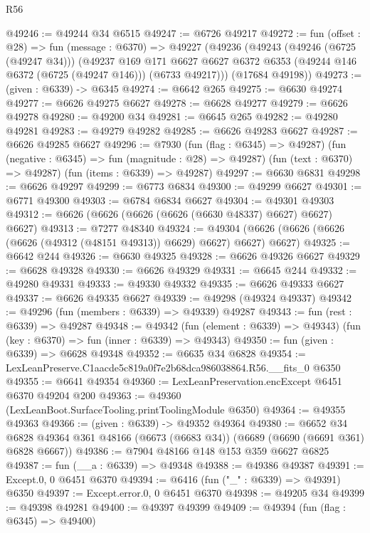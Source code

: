 \begin{lexlean}{R56}
\begin{coremodule}
@49246 := @49244 @34 @6515
@49247 := @6726 @49217
@49272 := fun (offset : @28) =>
  fun (message : @6370) =>
  @49227
    (@49236
      (@49243
        (@49246 (@6725 (@49247 @34)))
        (@49237
          @169
          @171
          @6627
          @6627
          @6372
          @6353
          (@49244 @146 @6372 (@6725 (@49247 @146)))
          (@6733 @49217)))
      (@17684 @49198))
@49273 := (given : @6339) -> @6345
@49274 := @6642 @265
@49275 := @6630 @49274
@49277 := @6626 @49275 @6627
@49278 := @6628 @49277
@49279 := @6626 @49278
@49280 := @49200 @34
@49281 := @6645 @265
@49282 := @49280 @49281
@49283 := @49279 @49282
@49285 := @6626 @49283 @6627
@49287 := @6626 @49285 @6627
@49296 := @7930
    (fun (flag : @6345) => @49287)
    (fun (negative : @6345) => fun (magnitude : @28) => @49287)
    (fun (text : @6370) => @49287)
    (fun (items : @6339) => @49287)
@49297 := @6630 @6831
@49298 := @6626 @49297
@49299 := @6773 @6834
@49300 := @49299 @6627
@49301 := @6771 @49300
@49303 := @6784 @6834 @6627
@49304 := @49301 @49303
@49312 := @6626 (@6626 (@6626 (@6626 (@6630 @48337) @6627) @6627) @6627)
@49313 := @7277 @48340
@49324 := @49304 (@6626 (@6626 (@6626 (@6626 (@49312 (@48151 @49313)) @6629) @6627) @6627) @6627)
@49325 := @6642 @244
@49326 := @6630 @49325
@49328 := @6626 @49326 @6627
@49329 := @6628 @49328
@49330 := @6626 @49329
@49331 := @6645 @244
@49332 := @49280 @49331
@49333 := @49330 @49332
@49335 := @6626 @49333 @6627
@49337 := @6626 @49335 @6627
@49339 := @49298 (@49324 @49337)
@49342 := @49296 (fun (members : @6339) => @49339) @49287
@49343 := fun (rest : @6339) => @49287
@49348 := @49342
    (fun (element : @6339) => @49343)
    (fun (key : @6370) => fun (inner : @6339) => @49343)
@49350 := fun (given : @6339) => @6628 @49348
@49352 := @6635 @34 @6828
@49354 := LexLeanPreserve.C1aacde5c819a0f7e2b68dca986038864.R56.__fits_0 @6350
@49355 := @6641 @49354
@49360 := LexLeanPreservation.encExcept @6451 @6370 @49204 @200
@49363 := @49360 (LexLeanBoot.SurfaceTooling.printToolingModule @6350)
@49364 := @49355 @49363
@49366 := (given : @6339) -> @49352 @49364
@49380 := @6652
    @34
    @6828
    @49364
    @361
    @48166
    (@6673 (@6683 @34))
    (@6689 (@6690 (@6691 @361) @6828 @6667))
@49386 := @7904 @48166 @148 @153 @359 @6627 @6825
@49387 := fun (__a : @6339) => @49348
@49388 := @49386 @49387
@49391 := Except.{0, 0} @6451 @6370
@49394 := @6416 (fun ("_" : @6339) => @49391) @6350
@49397 := Except.error.{0, 0} @6451 @6370
@49398 := @49205 @34
@49399 := @49398 @49281
@49400 := @49397 @49399
@49409 := @49394
    (fun (flag : @6345) => @49400)

\end{coremodule}
\end{lexlean}
